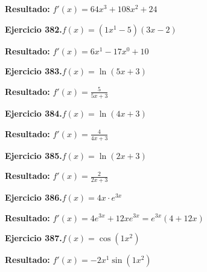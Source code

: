 \documentclass[10pt,a4paper]{article}
\begin{document}
\begin{solbox}
\textbf{Resultado:} \(\displaystyle f'(x) = 64x^{3} +108x^{2} +24\)
\end{solbox}

\newpage
\begin{ejbox}
\textbf{Ejercicio 382.}\quad $f(x) = (1x^{1} -5)(3x -2)$
\end{ejbox}

\begin{solbox}
\textbf{Resultado:} \(\displaystyle f'(x) = 6x^{1} -17x^{0} +10\)
\end{solbox}

\begin{ejbox}
\textbf{Ejercicio 383.}\quad $f(x) = \ln(5x + 3)$
\end{ejbox}

\begin{solbox}
\textbf{Resultado:} \(\displaystyle f'(x) = \frac{5}{5x + 3}\)
\end{solbox}

\begin{ejbox}
\textbf{Ejercicio 384.}\quad $f(x) = \ln(4x + 3)$
\end{ejbox}

\begin{solbox}
\textbf{Resultado:} \(\displaystyle f'(x) = \frac{4}{4x + 3}\)
\end{solbox}

\newpage
\begin{ejbox}
\textbf{Ejercicio 385.}\quad $f(x) = \ln(2x + 3)$
\end{ejbox}

\begin{solbox}
\textbf{Resultado:} \(\displaystyle f'(x) = \frac{2}{2x + 3}\)
\end{solbox}

\begin{ejbox}
\textbf{Ejercicio 386.}\quad $f(x) = 4x \cdot e^{3x}$
\end{ejbox}

\begin{solbox}
\textbf{Resultado:} \(\displaystyle f'(x) = 4e^{3x} + 12xe^{3x} = e^{3x}(4 + 12x)\)
\end{solbox}

\begin{ejbox}
\textbf{Ejercicio 387.}\quad $f(x) = \cos(1x^{2})$
\end{ejbox}

\begin{solbox}
\textbf{Resultado:} \(\displaystyle f'(x) = -2x^{1}\sin(1x^{2})\)
\end{solbox}
\end{document}
